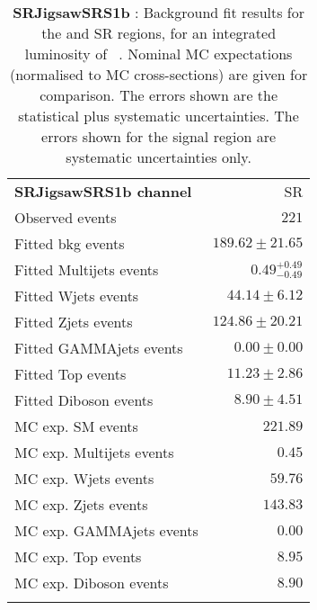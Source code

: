 

\begin{table}
\begin{center}
\setlength{\tabcolsep}{0.0pc}
{\tiny
\begin{tabular*}{\textwidth}{@{\extracolsep{\fill}}lr}
\noalign{\smallskip}\hline\noalign{\smallskip}
{\bf SRJigsawSRS1b channel}           & SR              \\[-0.05cm]
\noalign{\smallskip}\hline\noalign{\smallskip}
Observed events          & $221$                    \\
\noalign{\smallskip}\hline\noalign{\smallskip}
Fitted bkg events         & $189.62 \pm 21.65$              \\
\noalign{\smallskip}\hline\noalign{\smallskip}
        Fitted Multijets events         & $0.49_{-0.49}^{+0.49}$              \\
        Fitted Wjets events         & $44.14 \pm 6.12$              \\
        Fitted Zjets events         & $124.86 \pm 20.21$              \\
        Fitted GAMMAjets events         & $0.00 \pm 0.00$              \\
        Fitted Top events         & $11.23 \pm 2.86$              \\
        Fitted Diboson events         & $8.90 \pm 4.51$              \\
 \noalign{\smallskip}\hline\noalign{\smallskip}
MC exp. SM events              & $221.89$              \\
\noalign{\smallskip}\hline\noalign{\smallskip}
        MC exp. Multijets events         & $0.45$              \\
        MC exp. Wjets events         & $59.76$              \\
        MC exp. Zjets events         & $143.83$              \\
        MC exp. GAMMAjets events         & $0.00$              \\
        MC exp. Top events         & $8.95$              \\
        MC exp. Diboson events         & $8.90$              \\
\noalign{\smallskip}\hline\noalign{\smallskip}
\end{tabular*}
}
\end{center}
\caption{{\bf SRJigsawSRS1b} : Background fit results for the  and SR regions, for an integrated luminosity of \ourintlumi~\ifb. Nominal MC expectations (normalised to MC cross-sections) are given for comparison. The errors shown are the statistical plus systematic uncertainties. The errors shown for the signal region are systematic uncertainties only.}
\label{table.results.systematics.in.logL.fit.SR.SRJigsawSRS1b}
\end{table}
%